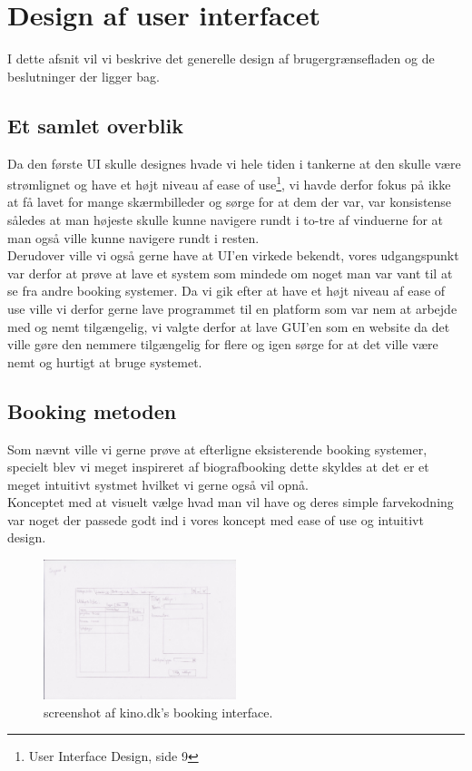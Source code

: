 \section{Design af user interfacet}
I dette afsnit vil vi beskrive det generelle design af brugergrænsefladen og de beslutninger der ligger bag.

\subsection{Et samlet overblik}
Da den første UI skulle designes hvade vi hele tiden i tankerne at den skulle være strømlignet og have et højt niveau af ease of use\footnote{User Interface Design, side 9}, vi havde derfor fokus på ikke at få lavet for mange skærmbilleder og sørge for at dem der var, var konsistense således at man højeste skulle kunne navigere rundt i to-tre af vinduerne for at man også ville kunne navigere rundt i resten.\\ Derudover ville vi også gerne have at UI'en virkede bekendt, vores udgangspunkt var derfor at prøve at lave et system som mindede om noget man var vant  til at se fra andre booking systemer.
Da vi gik efter at have et højt niveau af ease of use ville vi derfor gerne lave programmet til en platform som var nem at arbejde med og nemt tilgængelig, vi valgte derfor at lave GUI'en som en website  da det ville gøre den nemmere tilgængelig for flere og igen sørge for at det ville være nemt og hurtigt at bruge systemet.

\subsection{Booking metoden}
Som nævnt ville vi gerne prøve at efterligne eksisterende booking systemer, specielt blev vi meget inspireret af biografbooking dette skyldes at det er et meget intuitivt systmet hvilket vi gerne også vil opnå.\\ Konceptet med at visuelt vælge hvad man vil have og deres simple farvekodning var noget der passede godt ind i vores koncept med ease of use og intuitivt design.
\begin{figure}[h!]
  \caption{screenshot af kino.dk's booking interface.}
  \centering
    \includegraphics[width=0.5\textwidth]{Appendix/GUI-Prototype/PaperMockup/UdstyrsListe}
\end{figure}


